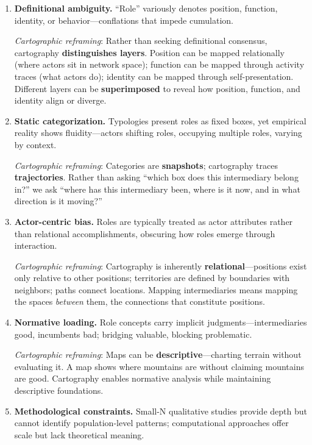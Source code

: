 \documentclass[../main.tex]{subfiles}
\begin{document}
\begin{enumerate}[leftmargin=*, itemsep=0.8em]

\item \textbf{Definitional ambiguity.} ``Role'' variously denotes position, function, identity, or behavior---conflations that impede cumulation.

\emph{Cartographic reframing}: Rather than seeking definitional consensus, cartography \textbf{distinguishes layers}. Position can be mapped relationally (where actors sit in network space); function can be mapped through activity traces (what actors do); identity can be mapped through self-presentation. Different layers can be \textbf{superimposed} to reveal how position, function, and identity align or diverge.

\item \textbf{Static categorization.} Typologies present roles as fixed boxes, yet empirical reality shows fluidity---actors shifting roles, occupying multiple roles, varying by context.

\emph{Cartographic reframing}: Categories are \textbf{snapshots}; cartography traces \textbf{trajectories}. Rather than asking ``which box does this intermediary belong in?'' we ask ``where has this intermediary been, where is it now, and in what direction is it moving?''

\item \textbf{Actor-centric bias.} Roles are typically treated as actor attributes rather than relational accomplishments, obscuring how roles emerge through interaction.

\emph{Cartographic reframing}: Cartography is inherently \textbf{relational}---positions exist only relative to other positions; territories are defined by boundaries with neighbors; paths connect locations. Mapping intermediaries means mapping the spaces \emph{between} them, the connections that constitute positions.

\item \textbf{Normative loading.} Role concepts carry implicit judgments---intermediaries good, incumbents bad; bridging valuable, blocking problematic.

\emph{Cartographic reframing}: Maps can be \textbf{descriptive}---charting terrain without evaluating it. A map shows where mountains are without claiming mountains are good. Cartography enables normative analysis while maintaining descriptive foundations.

\item \textbf{Methodological constraints.} Small-N qualitative studies provide depth but cannot identify population-level patterns; computational approaches offer scale but lack theoretical meaning.


\end{enumerate}
\end{document}
